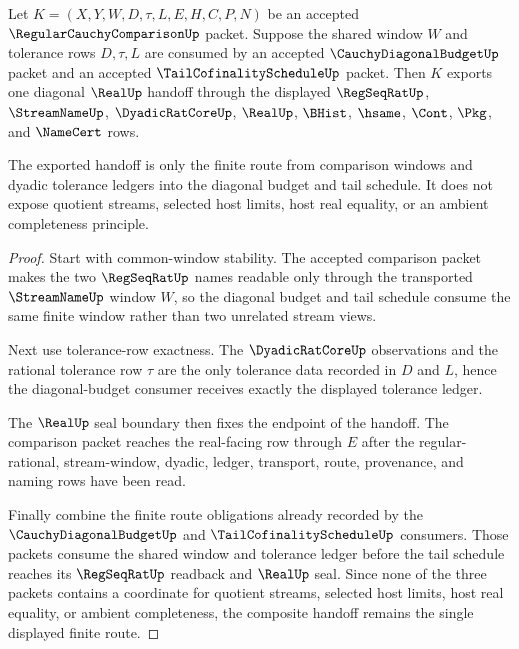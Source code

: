 \begin{theorem}
\label{thm:regular-cauchy-comparison-diagonal-budget-handoff}
Let $K=(X,Y,W,D,\tau,L,E,H,C,P,N)$ be an accepted $\RegularCauchyComparisonUp$ packet. Suppose the shared window $W$ and tolerance rows $D,\tau,L$ are consumed by an accepted $\CauchyDiagonalBudgetUp$ packet and an accepted $\TailCofinalityScheduleUp$ packet. Then $K$ exports one diagonal $\RealUp$ handoff through the displayed $\RegSeqRatUp$, $\StreamNameUp$, $\DyadicRatCoreUp$, $\RealUp$, $\BHist$, $\hsame$, $\Cont$, $\Pkg$, and $\NameCert$ rows.

The exported handoff is only the finite route from comparison windows and dyadic tolerance ledgers into the diagonal budget and tail schedule. It does not expose quotient streams, selected host limits, host real equality, or an ambient completeness principle.
\end{theorem}
\begin{proof}
Start with common-window stability. The accepted comparison packet makes the two $\RegSeqRatUp$ names readable only through the transported $\StreamNameUp$ window $W$, so the diagonal budget and tail schedule consume the same finite window rather than two unrelated stream views.

Next use tolerance-row exactness. The $\DyadicRatCoreUp$ observations and the rational tolerance row $\tau$ are the only tolerance data recorded in $D$ and $L$, hence the diagonal-budget consumer receives exactly the displayed tolerance ledger.

The $\RealUp$ seal boundary then fixes the endpoint of the handoff. The comparison packet reaches the real-facing row through $E$ after the regular-rational, stream-window, dyadic, ledger, transport, route, provenance, and naming rows have been read.

Finally combine the finite route obligations already recorded by the $\CauchyDiagonalBudgetUp$ and $\TailCofinalityScheduleUp$ consumers. Those packets consume the shared window and tolerance ledger before the tail schedule reaches its $\RegSeqRatUp$ readback and $\RealUp$ seal. Since none of the three packets contains a coordinate for quotient streams, selected host limits, host real equality, or ambient completeness, the composite handoff remains the single displayed finite route.
\end{proof}

